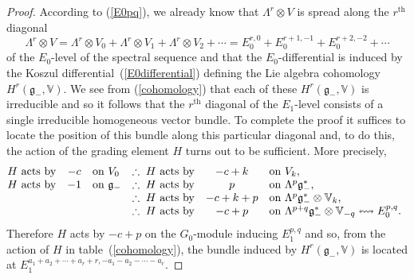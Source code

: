 \begin{proof} According to (\ref{E0pq}), we already know that
$\Lambda^r\otimes V$ is spread along the
$r^{\mathrm{th}}$ diagonal
\[\Lambda^r\otimes V=\Lambda^r\otimes V_0+\Lambda^r\otimes
V_1+\Lambda^r\otimes V_2+\cdots =
E_0^{r,0}+E_0^{r+1,-1}+E_0^{r+2,-2}+\cdots\]
of the $E_0$-level of the spectral sequence and that the $E_0$-dif\/ferential is
induced by the Koszul dif\/ferential~(\ref{E0differential}) def\/ining the Lie
algebra cohomology $H^r({\mathfrak{g}}_-,{\mathbb{V}})$. We see from
(\ref{cohomology}) that each of these $H^r({\mathfrak{g}}_-,{\mathbb{V}})$ is
irreducible and so it follows that the $r^{\mathrm{th}}$ diagonal of the
$E_1$-level consists of a single irreducible homogeneous vector bundle. To
complete the proof it suf\/f\/ices to locate the position of this bundle along this
particular diagonal and, to do this, the action of the grading element $H$
turns out to be suf\/f\/icient. More precisely,
\[\begin{array}{@{}rclrcl}
H\mbox{ acts by}&-c&\mbox{on }V_0&
\therefore\;H\mbox{ acts by}&-c+k&\mbox{on }V_k,\\
H\mbox{ acts by}&-1&\mbox{on }{\mathfrak{g}}_-&
\therefore\;H\mbox{ acts by}&p&\mbox{on }\Lambda^p{\mathfrak{g}}_-^*,\\
&&&\therefore\;H\mbox{ acts by}&-c+k+p&\mbox{on }
\Lambda^p{\mathfrak{g}}_-^*\otimes{\mathbb{V}}_k,\\
&&&\therefore\;H\mbox{ acts by}&-c+p&\mbox{on }
\Lambda^{p+q}{\mathfrak{g}}_-^*\otimes{\mathbb{V}}_{-q}\leftrightsquigarrow
E_0^{p,q}.
\end{array}\]
Therefore $H$ acts by $-c+p$ on the $G_0$-module inducing $E_1^{p,q}$ and so,
from the action of $H$ in table~(\ref{cohomology}), the bundle induced by
$H^r({\mathfrak{g}}_-,{\mathbb{V}})$ is located at
$E_1^{a_1+a_2+\cdots+a_r+r,-a_1-a_2-\cdots-a_r}$.


\end{proof}
